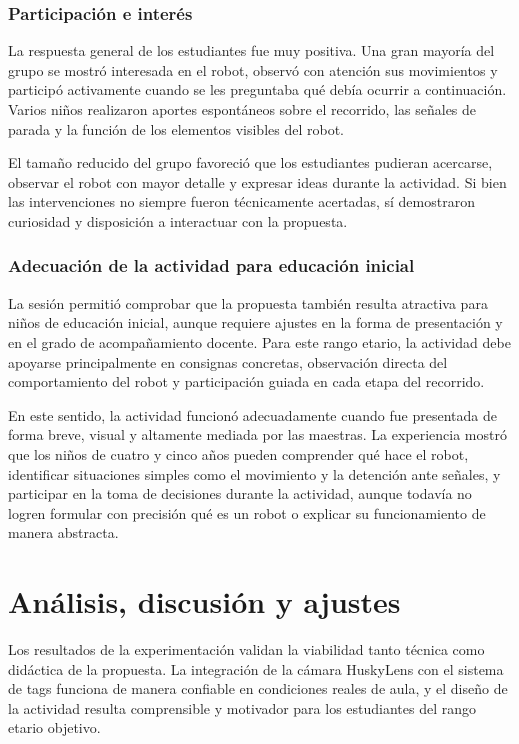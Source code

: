 \documentclass{prgrado}
\begin{document}
\subsubsection{Participación e interés}
La respuesta general de los estudiantes fue muy positiva. Una gran mayoría del grupo se mostró interesada en el robot, observó con atención sus movimientos y participó activamente cuando se les preguntaba qué debía ocurrir a continuación. Varios niños realizaron aportes espontáneos sobre el recorrido, las señales de parada y la función de los elementos visibles del robot.

El tamaño reducido del grupo favoreció que los estudiantes pudieran acercarse, observar el robot con mayor detalle y expresar ideas durante la actividad. Si bien las intervenciones no siempre fueron técnicamente acertadas, sí demostraron curiosidad y disposición a interactuar con la propuesta.
\subsubsection{Adecuación de la actividad para educación inicial}
La sesión permitió comprobar que la propuesta también resulta atractiva para niños de educación inicial, aunque requiere ajustes en la forma de presentación y en el grado de acompañamiento docente. Para este rango etario, la actividad debe apoyarse principalmente en consignas concretas, observación directa del comportamiento del robot y participación guiada en cada etapa del recorrido.

En este sentido, la actividad funcionó adecuadamente cuando fue presentada de forma breve, visual y altamente mediada por las maestras. La experiencia mostró que los niños de cuatro y cinco años pueden comprender qué hace el robot, identificar situaciones simples como el movimiento y la detención ante señales, y participar en la toma de decisiones durante la actividad, aunque todavía no logren formular con precisión qué es un robot o explicar su funcionamiento de manera abstracta.

\section{Análisis, discusión y ajustes}
Los resultados de la experimentación validan la viabilidad tanto técnica como didáctica de la propuesta. La integración de la cámara HuskyLens con el sistema de tags funciona de manera confiable en condiciones reales de aula, y el diseño de la actividad resulta comprensible y motivador para los estudiantes del rango etario objetivo.
\end{document}
